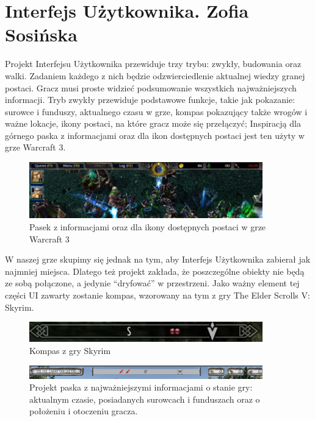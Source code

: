 \section{Interfejs Użytkownika. Zofia Sosińska}\label{chap:ui}

Projekt Interfejsu Użytkownika przewiduje trzy trybu: zwykły, budowania oraz walki. Zadaniem każdego z nich będzie odzwierciedlenie aktualnej wiedzy granej postaci. Gracz musi proste widzieć podsumowanie wszystkich najważniejszych informacji.
	Tryb zwykły przewiduje podstawowe funkcje, takie jak pokazanie:
surowce i funduszy,
aktualnego czasu w grze, 
kompas pokazujący także wrogów i ważne lokacje,
ikony postaci, na które gracz może się przełączyć;
Inspiracją dla górnego paska z informacjami  oraz dla ikon dostępnych postaci jest ten użyty w grze Warcraft 3.

\begin{figure}[htbp]
    \centering
    \includegraphics[width=0.9\textwidth]{images/ui/warcraft3.png}
    \caption{Pasek z informacjami oraz dla ikony dostępnych postaci w grze Warcraft 3}\label{fig:Warcraft3}
\end{figure}

W naszej grze skupimy się jednak na tym, aby Interfejs Użytkownika zabierał jak najmniej miejsca. Dlatego też projekt zakłada, że poszczególne obiekty nie będą ze sobą połączone, a jedynie “dryfować” w przestrzeni.
Jako ważny element tej części UI zawarty zostanie kompas, wzorowany na tym z gry The Elder Scrolls V: Skyrim.

\begin{figure}[htbp]
    \centering
    \includegraphics[width=0.9\textwidth]{images/ui/compassSkyrim.png}
    \caption{Kompas z gry Skyrim}\label{fig:Fallout}
\end{figure}


\begin{figure}[htbp]
    \centering
    \includegraphics[width=0.9\textwidth]{images/ui/naszpasek.png}
    \caption{Projekt paska z najważniejszymi informacjami o stanie gry: aktualnym czasie, posiadanych surowcach i funduszach oraz o położeniu i otoczeniu gracza.
    }\label{fig:compass}
\end{figure}
 

